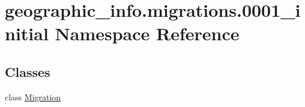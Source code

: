 \hypertarget{namespacegeographic__info_1_1migrations_1_10001__initial}{\section{geographic\-\_\-info.\-migrations.0001\-\_\-initial Namespace Reference}
\label{namespacegeographic__info_1_1migrations_1_10001__initial}
}
\subsection*{Classes}
\begin{DoxyCompactItemize}
\item 
class \hyperlink{classgeographic__info_1_1migrations_1_10001__initial_1_1_migration}{Migration}
\end{DoxyCompactItemize}
